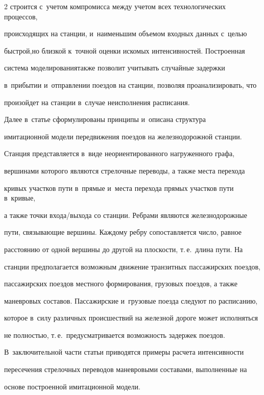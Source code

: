 \begin{multicols}{2}
строится с~учетом компромисса между учетом всех технологических процессов, 


происходящих на станции, и~наименьшим объемом входных данных с~целью 


быстрой,\linebreak но близкой к~точной оценки искомых интенсивностей. Построенная 


система моделирования\linebreak также позволит учитывать случайные задержки 


в~прибытии и~отправлении поездов на станции, позволяя проанализировать, что 


произойдет на станции в~случае неисполнения расписания.


      


      Далее в~статье сформулированы принципы и~описана структура 


имитационной модели передвижения поездов на железнодорожной станции. 


Станция представляется в~виде неориентированного нагруженного графа, 


вершинами которого являются стрелочные переводы, а также места перехода 


кривых участков пути в~прямые и~места перехода прямых участков пути в~кривые, 


а также точки входа/выхода со станции. Ребрами являются железнодорожные 


пути, связывающие вершины. Каждому ребру сопоставляется число, равное 


расстоянию от одной вершины до другой на плоскости, т.\,е.\ длина пути. На 


станции предполагается возможным движение транзитных пассажирских поездов, 


пассажирских поездов местного формирования, грузовых поездов, а также 


маневровых составов. Пассажирские и~грузовые поезда следуют по расписанию, 


которое в~силу различных происшествий на железной дороге может исполняться 


не полностью, т.\,е.\ предусматривается возможность задержек поездов. 


В~заключительной части статьи приводятся примеры расчета интенсивности 


пересечения стрелочных переводов маневровыми составами, выполненные на 


основе построенной имитационной модели.






\end{multicols}
